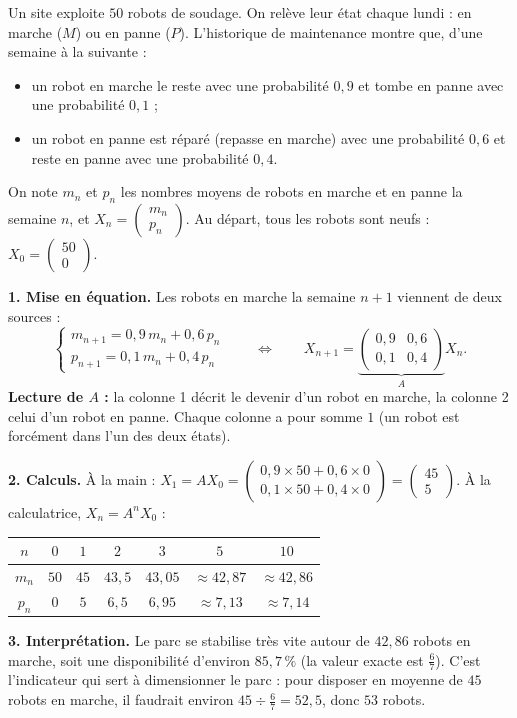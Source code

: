 \documentclass[a4paper,11pt]{article}
\newcommand{\M}[1]{\begin{pmatrix}#1\end{pmatrix}}
\begin{document}
\begin{appliindus}\label{ex:robots}
Un site exploite $50$ robots de soudage. On relève leur état chaque lundi : en marche ($M$) ou en panne ($P$). L'historique de maintenance montre que, d'une semaine à la suivante :
\begin{itemize}
  \item un robot en marche le reste avec une probabilité $0{,}9$ et tombe en panne avec une probabilité $0{,}1$ ;
  \item un robot en panne est réparé (repasse en marche) avec une probabilité $0{,}6$ et reste en panne avec une probabilité $0{,}4$.
\end{itemize}
On note $m_n$ et $p_n$ les nombres moyens de robots en marche et en panne la semaine $n$, et $X_n = \M{m_n\\p_n}$. Au départ, tous les robots sont neufs : $X_0 = \M{50\\0}$.

\textbf{1. Mise en équation.} Les robots en marche la semaine $n+1$ viennent de deux sources :
\[
\left\{\begin{array}{l} m_{n+1} = 0{,}9\,m_n + 0{,}6\,p_n\\ p_{n+1} = 0{,}1\,m_n + 0{,}4\,p_n \end{array}\right.
\qquad\Longleftrightarrow\qquad
X_{n+1} = \underbrace{\M{0{,}9 & 0{,}6\\ 0{,}1 & 0{,}4}}_{A} X_n.
\]
\textbf{Lecture de $A$ :} la colonne 1 décrit le devenir d'un robot en marche, la colonne 2 celui d'un robot en panne. Chaque colonne a pour somme $1$ (un robot est forcément dans l'un des deux états).

\textbf{2. Calculs.} À la main : $X_1 = AX_0 = \M{0{,}9\times 50 + 0{,}6\times 0\\ 0{,}1\times 50 + 0{,}4\times 0} = \M{45\\5}$. À la calculatrice, $X_n = A^nX_0$ :
\begin{center}
\renewcommand{\arraystretch}{1.3}
\begin{tabular}{|c|c|c|c|c|c|c|}
\hline
\rowcolor{uimmlightblue}
$n$ & $0$ & $1$ & $2$ & $3$ & $5$ & $10$ \\
\hline
$m_n$ & $50$ & $45$ & $43{,}5$ & $43{,}05$ & $\approx 42{,}87$ & $\approx 42{,}86$ \\
\hline
$p_n$ & $0$ & $5$ & $6{,}5$ & $6{,}95$ & $\approx 7{,}13$ & $\approx 7{,}14$ \\
\hline
\end{tabular}
\end{center}
\textbf{3. Interprétation.} Le parc se stabilise très vite autour de $42{,}86$ robots en marche, soit une disponibilité d'environ $85{,}7\,\%$ (la valeur exacte est $\frac{6}{7}$). C'est l'indicateur qui sert à dimensionner le parc : pour disposer en moyenne de $45$ robots en marche, il faudrait environ $45\div\frac{6}{7}=52{,}5$, donc $53$ robots.
\end{appliindus}
\end{document}
